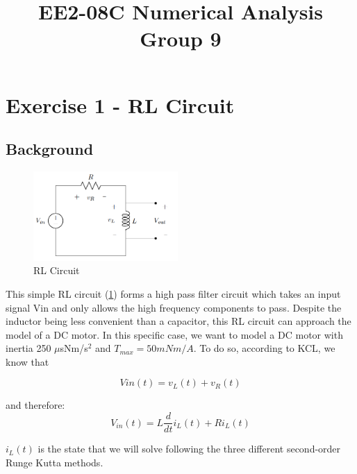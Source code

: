 \documentclass[11pt,a4paper]{article}
\date{}
\author{}
\begin{document}
\vspace{-20mm}
\title{\textbf{EE2-08C Numerical Analysis} \\ Group 9\vspace{-17mm}}
\maketitle
\tableofcontents
\pagebreak

\section{Exercise 1 - RL Circuit}\vspace{-1mm}

\subsection{Background}
\begin{figure}
\vspace{-10mm}
\includegraphics[width=0.49\textwidth]{Ex1_Figs/RL_circuit.png}
\vspace{-6mm}
\caption{RL Circuit}
\label{fig:RL1}
\end{figure}

This simple RL circuit (\ref{fig:RL1}) forms a high pass filter circuit which takes an input signal Vin and only allows the high frequency components to pass. Despite the inductor being less convenient than a capacitor, this RL circuit can approach the model of a DC motor. In this specific case, we want to model a DC motor with inertia 250 $\mu$sNm/s$^2$ and $T_{max} = 50 mNm/A$. To do so, according to KCL, we know that

\begin{equation}
Vin(t) = v_L(t) + v_R(t)
\end{equation}


and therefore:
\begin{equation}
V_{in}(t) = L\frac{d}{dt}i_L(t) + R i_L(t)
\end{equation}

$i_L(t)$ is the state that we will solve following the three different second-order Runge Kutta methods.
\end{document}
